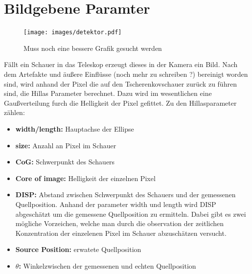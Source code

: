 \section{Bildgebene Paramter}
\begin{figure}[H]
  \centering
  \texttt{[image: images/detektor.pdf]}
  \caption{Muss noch eine bessere Grafik gesucht werden}
\end{figure}
Fällt ein Schauer in das Teleskop erzeugt dieses in der Kamera ein Bild. Nach dem Artefakte und äußere Einflüsse (noch mehr zu schreiben ?) bereinigt worden sind, wird anhand der Pixel die auf den Tscherenkovschauer zurück zu führen sind, die Hillas Parameter berechnet. 
Dazu wird im wesentlichen eine Gaußverteilung furch die Helligkeit der Pixel gefittet. 
Zu den Hillasparameter zählen:
\begin{itemize}
  \item \textbf{width/length:} Hauptachse der Ellipse
  \item \textbf{size:} Anzahl an Pixel im Schauer
  \item \textbf{CoG:} Schwerpunkt des Schauers
  \item \textbf{Core of image:} Helligkeit der einzelnen Pixel
  \item \textbf{DISP:} Abstand zwischen Schwerpunkt des Schauers und der gemessenen Quellposition. Anhand der parameter width und length wird DISP abgeschätzt um die gemessene Quellposition zu ermitteln. Dabei gibt es zwei mögliche Vorzeichen, welche man durch die observation der zeitlichen Konzentration der einzelenen Pixel im Schauer abzuschätzen versucht.
  \item \textbf{Source Position:} erwatete Quellposition
  \item \textbf{$\theta$:} Winkelzwischen der gemessenen und echten Quellposition
\end{itemize}

